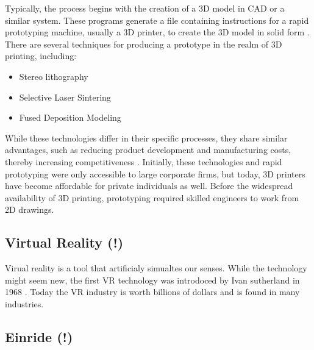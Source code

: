 Typically, the process begins with the creation of a 3D model in CAD or a similar system. 
These programs generate a file containing instructions for a rapid prototyping machine, usually 
a 3D printer, to create the 3D model in solid form \cite{sriharsha2018rapid}. There are several 
techniques for producing a prototype in the realm of 3D printing, including:
\begin{itemize}
    \item Stereo lithography
    \item Selective Laser Sintering
    \item Fused Deposition Modeling
\end{itemize}
While these technologies differ in their specific processes, they share similar advantages, such as 
reducing product development and manufacturing costs, thereby increasing competitiveness 
\cite{PHAM19981257}. Initially, these technologies and rapid prototyping were only accessible to 
large corporate firms, but today, 3D printers have become affordable for private individuals as well. 
Before the widespread availability of 3D printing, prototyping required skilled engineers to work from 
2D drawings.


\subsection{Virtual Reality (!)}
Virual reality  is a tool that artificialy simualtes our senses. While the technology might seem new, 
the first VR technology was introdoced by Ivan sutherland in 1968 \cite{lavalle2023virtual}. Today the VR
industry is worth billions of dollars and is found in many industries.
\subsection{Einride (!)}
